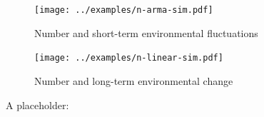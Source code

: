 \clearpage

\begin{figure}[htbp]
\centering
\texttt{[image: ../examples/n-arma-sim.pdf]}
\caption{Number and short-term environmental fluctuations}
\label{f:eg-n-arma}
\end{figure}

\clearpage

\begin{figure}[htbp]
\centering
\texttt{[image: ../examples/n-linear-sim.pdf]}
\caption{Number and long-term environmental change}
\label{f:eg-n-linear}
\end{figure}

\clearpage

A placeholder: \citep{schindler2010}




